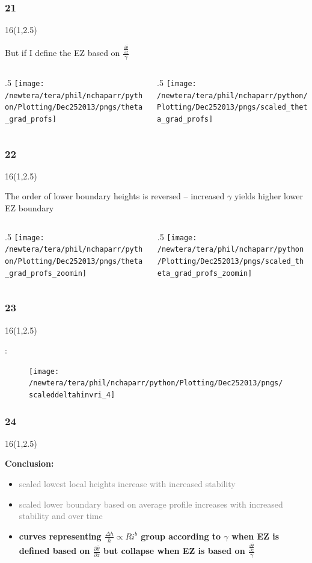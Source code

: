 \documentclass{beamer}
\newcommand\FrameText[1]{
\begin{textblock}{16}(1,2.5)
\raggedright #1
\end{textblock}}
\begin{document}
\begin{frame}
\frametitle{21}
\FrameText{But if I define the EZ based on $\frac{\frac{\partial \overline{\theta}}{\partial z}}{\gamma}$ 
}

\begin{columns}[T]
   \begin{column}{.5\textwidth}
   \texttt{[image: /newtera/tera/phil/nchaparr/python/Plotting/Dec252013/pngs/theta\_grad\_profs]} 
   \end{column} 
   
   \begin{column}{.5\textwidth}
    \texttt{[image: /newtera/tera/phil/nchaparr/python/Plotting/Dec252013/pngs/scaled\_theta\_grad\_profs]}
   \end{column}     
\end{columns}
\end{frame}

\begin{frame}
\frametitle{22}
\FrameText{The order of lower boundary heights is reversed -- increased $\gamma$ yields higher lower EZ boundary 
}

\begin{columns}[T]
   \begin{column}{.5\textwidth}
   \texttt{[image: /newtera/tera/phil/nchaparr/python/Plotting/Dec252013/pngs/theta\_grad\_profs\_zoomin]} 
   \end{column} 
   
   \begin{column}{.5\textwidth}
    \texttt{[image: /newtera/tera/phil/nchaparr/python/Plotting/Dec252013/pngs/scaled\_theta\_grad\_profs\_zoomin]}
   \end{column}     
\end{columns}
\end{frame}

\begin{frame}
\frametitle{23}
\FrameText{:
}
\begin{figure}
\centering
\texttt{[image: /newtera/tera/phil/nchaparr/python/Plotting/Dec252013/pngs/scaleddeltahinvri\_4]}
\end{figure}

\end{frame}

\begin{frame}
\frametitle{24}
\FrameText{\bf{\large Conclusion}:
\begin{itemize}
\item \textcolor{gray}{scaled lowest local heights increase with increased stability}
\item \textcolor{gray}{scaled lower boundary based on average profile increases with increased stability and over time}
\item \bf{\large curves representing  $\frac{\Delta h}{h} \propto Ri ^{b}$ group according to $\gamma$ when EZ is defined based on $\frac{\partial \overline{\theta}}{\partial z}$ but collapse when EZ is based on $\frac{\frac{\partial \overline{\theta}}{\partial z}}{\gamma}$} 
\end{itemize}
}
\end{frame}
\end{document}
